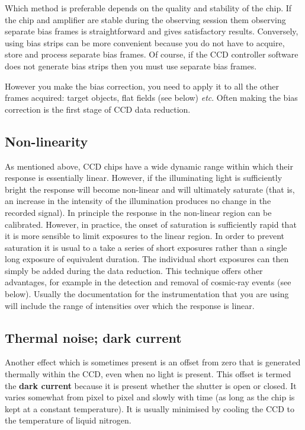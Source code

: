 \documentclass[twoside,11pt]{article}
\begin{document}
Which method is preferable depends on the quality and stability of the
chip.  If the chip and amplifier are stable during the observing session
them observing separate bias frames is straightforward and gives
satisfactory results.  Conversely, using bias strips can be more
convenient because you do not have to acquire, store and process separate
bias frames.  Of course, if the CCD controller software does not generate
bias strips then you must use separate bias frames.

However you make the bias correction, you need to apply it to all the
other frames acquired: target objects, flat fields (see below) \emph{etc}.
Often making the bias correction is the first stage of CCD data reduction.

\subsection{Non-linearity}

As mentioned above, CCD chips have a wide dynamic range within which
their response is essentially linear.  However, if the illuminating
light is sufficiently bright the response will become non-linear and will
ultimately saturate (that is, an increase in the intensity of the
illumination produces no change in the recorded signal).  In principle
the response in the non-linear region can be calibrated.  However, in
practice, the onset of saturation is sufficiently rapid that it is more
sensible to limit exposures to the linear region.  In order to prevent
saturation it is usual to a take a series of short exposures rather than
a single long exposure of equivalent duration.  The individual short
exposures can then simply be added during the data reduction.  This
technique offers other advantages, for example in the detection and removal
of cosmic-ray events (see below).  Usually the documentation for the
instrumentation that you are using will include the range of intensities
over which the response is linear.

\subsection{Thermal noise; dark current}

Another effect which is sometimes present is an offset from zero that is
generated thermally within the CCD, even when no light is present.  This
offset is termed the {\bf dark current} because it is present whether the
shutter is open or closed.  It varies somewhat from pixel to pixel and
slowly with time (as long as the chip is kept at a constant temperature).
It is usually minimised by cooling the CCD to the temperature of liquid
nitrogen.
\end{document}
